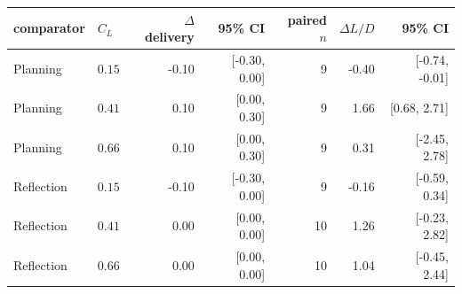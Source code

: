 \begin{tabular}{llrrrrr}
\toprule
comparator & $C_L$ & $\Delta$ delivery & 95\% CI & paired $n$ & $\Delta L/D$ & 95\% CI \\
\midrule
Planning & $0.15$ & -0.10 & [-0.30, 0.00] & 9 & -0.40 & [-0.74, -0.01] \\
Planning & $0.41$ & 0.10 & [0.00, 0.30] & 9 & 1.66 & [0.68, 2.71] \\
Planning & $0.66$ & 0.10 & [0.00, 0.30] & 9 & 0.31 & [-2.45, 2.78] \\
Reflection & $0.15$ & -0.10 & [-0.30, 0.00] & 9 & -0.16 & [-0.59, 0.34] \\
Reflection & $0.41$ & 0.00 & [0.00, 0.00] & 10 & 1.26 & [-0.23, 2.82] \\
Reflection & $0.66$ & 0.00 & [0.00, 0.00] & 10 & 1.04 & [-0.45, 2.44] \\
\bottomrule
\end{tabular}
